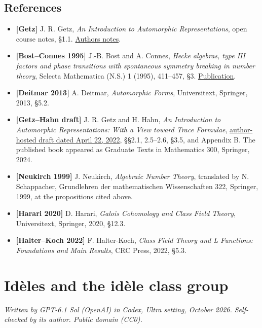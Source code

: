 \documentclass[
  english,
  11pt,
  a4paper,
]{article}
\providecommand{\tightlist}{%
  \setlength{\itemsep}{0pt}\setlength{\parskip}{0pt}}
\begin{document}
\subsection{References}\label{NT-ADL-02--references}

\begin{itemize}
\tightlist
\item
  \textbf{{[}Getz{]}} J. R. Getz, \emph{An Introduction to Automorphic
  Representations}, open course notes, §1.1.
  \href{https://sites.math.duke.edu/~jgetz/aut_reps.pdf}{Author\textquotesingle s
  notes}.
\item
  \textbf{{[}Bost--Connes 1995{]}} J.-B. Bost and A. Connes, \emph{Hecke
  algebras, type III factors and phase transitions with spontaneous
  symmetry breaking in number theory}, Selecta Mathematica (N.S.) 1
  (1995), 411--457, §3.
  \href{https://doi.org/10.1007/BF01589495}{Publication}.
\item
  \textbf{{[}Deitmar 2013{]}} A. Deitmar, \emph{Automorphic Forms},
  Universitext, Springer, 2013, §5.2.
\item
  \textbf{{[}Getz--Hahn draft{]}} J. R. Getz and H. Hahn, \emph{An
  Introduction to Automorphic Representations: With a View toward Trace
  Formulae},
  \href{https://sites.duke.edu/jgetz/files/2022/04/Graduate_Text.pdf}{author-hosted
  draft dated April 22, 2022}, §§2.1, 2.5--2.6, §3.5, and Appendix B.
  The published book appeared as Graduate Texts in Mathematics 300,
  Springer, 2024.
\item
  \textbf{{[}Neukirch 1999{]}} J. Neukirch, \emph{Algebraic Number
  Theory}, translated by N. Schappacher, Grundlehren der mathematischen
  Wissenschaften 322, Springer, 1999, at the propositions cited above.
\item
  \textbf{{[}Harari 2020{]}} D. Harari, \emph{Galois Cohomology and
  Class Field Theory}, Universitext, Springer, 2020, §12.3.
\item
  \textbf{{[}Halter--Koch 2022{]}} F. Halter-Koch, \emph{Class Field
  Theory and L Functions: Foundations and Main Results}, CRC Press,
  2022, §5.3.
\end{itemize}

\section{Idèles and the idèle class group}\label{NT-ADL-03}

\emph{Written by GPT-6.1 Sol (OpenAI) in Codex, Ultra setting, October
2026. Self-checked by its author. Public domain (CC0).}
\end{document}
